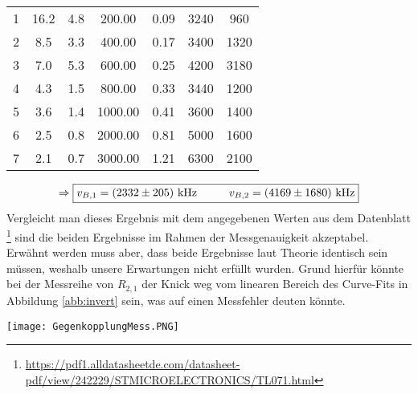 \begin{center}
\begin{tabular}{l | c c c c | c c}
        \hline
        1 &  16.2 &  4.8 &   200.00 &  0.09 &   3240 &   960 \\    
        2 &   8.5 &  3.3 &   400.00 &  0.17 &   3400 &  1320 \\    
        3 &   7.0 &  5.3 &   600.00 &  0.25 &   4200 &  3180 \\    
        4 &   4.3 &  1.5 &   800.00 &  0.33 &   3440 &  1200 \\    
        5 &   3.6 &  1.4 &  1000.00 &  0.41 &   3600 &  1400 \\    
        6 &   2.5 &  0.8 &  2000.00 &  0.81 &   5000 &  1600 \\    
        7 &   2.1 &  0.7 &  3000.00 &  1.21 &   6300 &  2100 \\
    \end{tabular}
    \label{tab:vB2}
\end{center}
\begin{gather}
    \Rightarrow\boxed{v_{B,1} = (2332 \pm 205)~\text{kHz}\hspace*{1cm} v_{B,2} = (4169 \pm 1680)~\text{kHz}}
\end{gather}
Vergleicht man dieses Ergebnis mit dem angegebenen Werten aus dem Datenblatt \footnote{\url{https://pdf1.alldatasheetde.com/datasheet-pdf/view/242229/STMICROELECTRONICS/TL071.html}} sind die beiden Ergebnisse im Rahmen der Messgenauigkeit akzeptabel. Erwähnt werden muss aber, dass beide Ergebnisse laut Theorie identisch sein müssen, weshalb unsere Erwartungen nicht erfüllt wurden. Grund hierfür könnte bei der Messreihe von $R_{2,1}$ der Knick weg vom linearen Bereich des Curve-Fits in Abbildung \ref{abb:invert} sein, was auf einen Messfehler deuten könnte. 
\newpage 
\begin{center}
    \texttt{[image: GegenkopplungMess.PNG]}
    \label{abb:invert}
\end{center}


